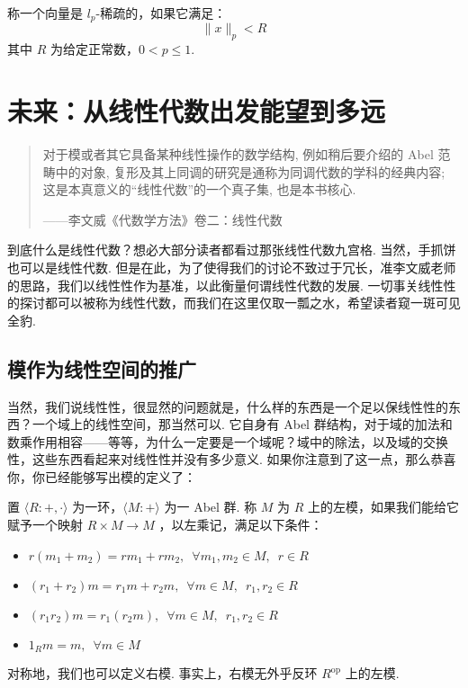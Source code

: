 \begin{definition}{}{}
    称一个向量是 $l_p$-稀疏的，如果它满足：
    \[ \lVert x \rVert_p < R \]
    其中 $R$ 为给定正常数，$0 < p \leqslant 1$.
\end{definition}

\section{未来：从线性代数出发能望到多远}

\begin{quote}

    \kaishu
    对于模或者其它具备某种线性操作的数学结构, 例如稍后要介绍的 Abel 范畴中的对象, 复形及其上同调的研究是通称为同调代数的学科的经典内容; 这是本真意义的``线性代数''的一个真子集, 也是本书核心.

    \begin{flushright}
        \kaishu
        ——李文威《代数学方法》卷二：线性代数
    \end{flushright}

\end{quote}

到底什么是线性代数？想必大部分读者都看过那张线性代数九宫格. 当然，手抓饼也可以是线性代数. 但是在此，为了使得我们的讨论不致过于冗长，准李文威老师的思路，我们以线性性作为基准，以此衡量何谓线性代数的发展. 一切事关线性性的探讨都可以被称为线性代数，而我们在这里仅取一瓢之水，希望读者窥一斑可见全豹.

\subsection{模作为线性空间的推广}

当然，我们说线性性，很显然的问题就是，什么样的东西是一个足以保线性性的东西？一个域上的线性空间，那当然可以. 它自身有 Abel 群结构，对于域的加法和数乘作用相容——等等，为什么一定要是一个域呢？域中的除法，以及域的交换性，这些东西看起来对线性性并没有多少意义. 如果你注意到了这一点，那么恭喜你，你已经能够写出模的定义了：

\begin{definition}{}{}
    置 $\langle R : +, \cdot \rangle$ 为一环，$\langle M : + \rangle$ 为一 Abel 群. 称 $M$ 为 $R$ 上的左模，如果我们能给它赋予一个映射 $R \times M \to M$ ，以左乘记，满足以下条件：

    \begin{itemize}
        \item $r(m_1 + m_2) = rm_1 + rm_2,\enspace \forall m_1, m_2 \in M,\enspace r \in R$

        \item $(r_1 + r_2)m = r_1m + r_2m,\enspace \forall m \in M,\enspace r_1, r_2 \in R$

        \item $(r_1r_2)m = r_1(r_2m),\enspace \forall m \in M,\enspace r_1, r_2 \in R$

        \item $1_Rm = m,\enspace \forall m \in M$
    \end{itemize}

    对称地，我们也可以定义右模. 事实上，右模无外乎反环 $R^{\mathrm{op}}$ 上的左模.
\end{definition}

